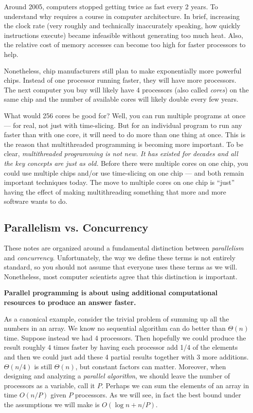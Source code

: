 \documentclass[10pt]{article}
\begin{document}
Around 2005, computers stopped getting twice as fast every 2 years.
To understand why requires a course in computer architecture.  In
brief, increasing the clock rate (very roughly and technically
inaccurately speaking, how quickly instructions execute) became
infeasible without generating too much heat.  Also, the relative cost
of memory accesses can become too high for faster processors to help.

Nonetheless, chip manufacturers still plan to make exponentially more
powerful chips.  Instead of one processor running faster, they will
have more processors.  The next computer you buy will likely have 4
processors (also called \emph{cores}) on the same chip and the number
of available cores will likely double every few years.

What would 256 cores be good for?  Well, you can run multiple programs
at once --- for real, not just with time-slicing.  But for an
individual program to run any faster than with one core, it will need
to do more than one thing at once.  This is the reason that
multithreaded programming is becoming more important.  To be clear,
\emph{multithreaded programming is not new.  It has existed for
decades and all the key concepts are just as old.}
Before there were multiple cores on one chip, you could use multiple
chips and/or use time-slicing on one chip --- and both remain
important techniques today.  The move to multiple cores on one chip is
``just'' having the effect of making multithreading something that
more and more software wants to do.

\subsection{Parallelism vs. Concurrency}

These notes are organized around a fundamental distinction between
\emph{parallelism} and \emph{concurrency}.  Unfortunately, the way we
define these terms is not entirely standard, so you should not assume
that everyone uses these terms as we will.  Nonetheless, most computer
scientists agree that this distinction is important.

\medskip
\noindent\textbf{Parallel programming is about using additional computational
resources to produce an answer faster.}
\medskip

As a canonical example, consider the trivial problem of summing up all
the numbers in an array.  We know no sequential algorithm can do
better than $\Theta(n)$ time.  Suppose instead we had 4 processors.  Then
hopefully we could produce the result roughly 4 times faster by having
each processor add 1/4 of the elements and then we could just add
these 4 partial results together with 3 more additions.  $\Theta(n/4)$
is still $\Theta(n)$, but constant factors can matter.  Moreover, when
designing and analyzing a \emph{parallel algorithm}, we should leave
the number of processors as a variable, call it $P$.  Perhaps we can
sum the elements of an array in time $O(n/P)$ given $P$ processors.
As we will see, in fact the best bound under the assumptions we will
make is $O(\log n + n/P)$.
\end{document}
